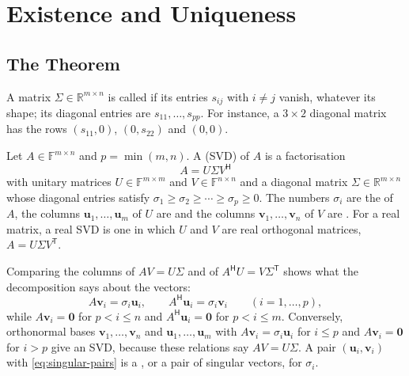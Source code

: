 \section{Existence and Uniqueness}
\label{sec:svd-existence}

\subsection{The Theorem}

A matrix $\Sigma\in\mathbb R^{m\times n}$ is called  if its entries $s_{ij}$ with $i\ne j$ vanish, whatever its shape; its diagonal entries are $s_{11},\ldots,s_{pp}$. For instance, a $3\times2$ diagonal matrix has the rows $(s_{11},0)$, $(0,s_{22})$ and $(0,0)$.

\begin{definition}
\label{def:svd}
Let $A\in\mathbb F^{m\times n}$ and $p=\min(m,n)$. A  (SVD) of $A$ is a factorisation
\[
A=U\Sigma V^{\mathsf H}
\]
with unitary matrices $U\in\mathbb F^{m\times m}$ and $V\in\mathbb F^{n\times n}$ and a diagonal matrix $\Sigma\in\mathbb R^{m\times n}$ whose diagonal entries satisfy $\sigma_1\ge\sigma_2\ge\cdots\ge\sigma_p\ge0$. The numbers $\sigma_i$ are the  of $A$, the columns $\mathbf u_1,\ldots,\mathbf u_m$ of $U$ are  and the columns $\mathbf v_1,\ldots,\mathbf v_n$ of $V$ are . For a real matrix, a real SVD is one in which $U$ and $V$ are real orthogonal matrices, $A=U\Sigma V^{\mathsf T}$.
\end{definition}

Comparing the columns of $AV=U\Sigma$ and of $A^{\mathsf H}U=V\Sigma^{\mathsf T}$ shows what the decomposition says about the vectors:
\begin{equation}
A\mathbf v_i=\sigma_i\mathbf u_i,\qquad A^{\mathsf H}\mathbf u_i=\sigma_i\mathbf v_i\qquad(i=1,\ldots,p),
\label{eq:singular-pairs}
\end{equation}
while $A\mathbf v_i=\mathbf 0$ for $p<i\le n$ and $A^{\mathsf H}\mathbf u_i=\mathbf 0$ for $p<i\le m$. Conversely, orthonormal bases $\mathbf v_1,\ldots,\mathbf v_n$ and $\mathbf u_1,\ldots,\mathbf u_m$ with $A\mathbf v_i=\sigma_i\mathbf u_i$ for $i\le p$ and $A\mathbf v_i=\mathbf 0$ for $i>p$ give an SVD, because these relations say $AV=U\Sigma$. A pair $(\mathbf u_i,\mathbf v_i)$ with \eqref{eq:singular-pairs} is a , or a pair of singular vectors, for $\sigma_i$.

